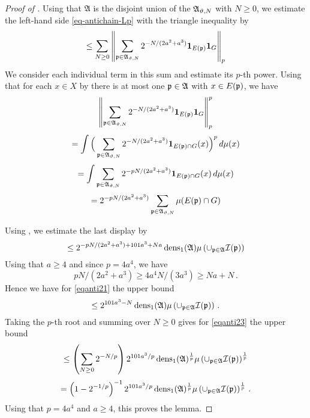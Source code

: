 \begin{proof}[Proof of ]
\leanok
{}

Using that $\mathfrak{A}$ is the disjoint union of the $\mathfrak{A}_{{\vartheta},N}$ with $N\ge 0$,
we estimate the left-hand side \eqref{eq-antichain-Lp}
with the triangle inequality by
\begin{equation}\label{eqanti23}
\le \sum_{N\ge 0} \left\|\sum_{{\mathfrak p}\in \mathfrak{A}_{{\vartheta},N}} 2^{-N/(2a^2+a^3)}\mathbf{1}_{E({\mathfrak p})} \mathbf{1}_G\right\|_{p}
\end{equation}
We consider each individual term in this sum and estimate its $p$-th power.
Using that for each $x\in X$ by  there is at most one ${\mathfrak p}\in \mathfrak{A}$ with $x\in E({\mathfrak p})$, we have
\begin{equation}
    \left\|\sum_{{\mathfrak p}\in \mathfrak{A}_{{\vartheta},N}} 2^{-N/(2a^2+a^3)}\mathbf{1}_{E({\mathfrak p})} \mathbf{1}_G\right\|_{p}^p
\end{equation}
\begin{equation}
    =\int\Big(\sum_{{\mathfrak p}\in \mathfrak{A}_{{\vartheta},N}}2^{-N/(2a^2+a^3)}\mathbf{1}_{E({\mathfrak p})\cap G}(x)\Big)^p\, d\mu(x)
\end{equation}
\begin{equation}
    =\int\sum_{{\mathfrak p}\in\mathfrak{A}_{{\vartheta},N}}2^{-pN/(2a^2+a^3)}\mathbf{1}_{E({\mathfrak p})\cap G}(x)\, d\mu(x)
\end{equation}
\begin{equation}
    = 2^{-pN/(2a^2+a^3)} \sum_{{\mathfrak p}\in\mathfrak{A}_{{\vartheta},N}}\mu(E({\mathfrak p})\cap G)
\end{equation}

Using , we estimate the last display by
\begin{equation}\label{eqanti21}
    \le 2^{-pN/(2a^2+a^3)+101a^3+Na}\operatorname{\operatorname{dens}}_1(\mathfrak{A})\mu\left(\cup_{{\mathfrak p}\in\mathfrak{A}}{\mathcal{I}}({\mathfrak p})\right)
\end{equation}
Using that $a\ge 4$ and since $p = 4a^4$, we have
$$
    pN/(2a^2+a^3)\ge 4a^4N/(3a^3) \ge Na+N\, .
$$
Hence we have for \eqref{eqanti21} the upper bound
$$
    \le 2^{101a^3-N}\operatorname{\operatorname{dens}}_1(\mathfrak{A})\mu\left(\cup_{{\mathfrak p}\in\mathfrak{A}}{\mathcal{I}}({\mathfrak p})\right)\, .
$$
Taking the $p$-th root and summing over $N\ge 0$ gives for \eqref{eqanti23} the upper bound
$$
    \le \left(\sum_{N\ge 0} 2^{-N/p}\right)2^{101a^3/p}\operatorname{\operatorname{dens}}_1(\mathfrak{A})^{{\frac{1}{p}}}\mu\left(\cup_{{\mathfrak p}\in\mathfrak{A}}{\mathcal{I}}({\mathfrak p})\right)^{{\frac{1}{p}}}
$$
$$
    = \left(1-2^{-1/p}\right)^{-1} 2^{101a^3/p} \operatorname{\operatorname{dens}}_1(\mathfrak{A})^{\frac 1p}\mu\left(\cup_{{\mathfrak p}\in\mathfrak{A}}{\mathcal{I}}({\mathfrak p})\right)^{\frac 1p}\, .
$$
Using that $p = 4a^4$ and $a \ge 4$, this proves the lemma.
\end{proof}

